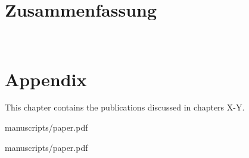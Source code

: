\documentclass[twoside, 12pt, a4paper]{report}
\begin{document}
\newpage 
\ %

\chapter*{Zusammenfassung}
\label{ch:zusammenfassung}
\lipsum[2-4]

\newpage 
\ %

\newpage
{}
\setcounter{page}{6}
\tableofcontents






\newpage




\chapter*{Appendix}
\renewcommand{\thesection}{Manuscript \arabic{section}}

This chapter contains the publications discussed in chapters X-Y.


    {manuscripts/paper.pdf}

    {manuscripts/paper.pdf}
\end{document}
